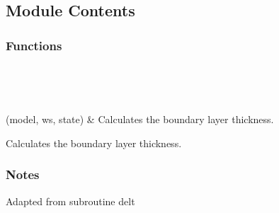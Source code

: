 \documentclass[letterpaper,10pt,english]{sphinxmanual}
\begin{document}
\subsection{Module Contents}
\label{\detokenize{autoapi/BoundaryThickness/index:module-contents}}

\subsubsection{Functions}
\label{\detokenize{autoapi/BoundaryThickness/index:functions}}

\begin{savenotes}\sphinxatlongtablestart\begin{longtable}[c]{}
\hline

\endfirsthead

%
{}\\
\hline

\endhead

\hline
{}\\
\endfoot

\endlastfoot

\sphinxAtStartPar
{\hyperref[\detokenize{autoapi/BoundaryThickness/index:BoundaryThickness.boundary_thickness}]{}}(model, ws, state)
&
\sphinxAtStartPar
Calculates the boundary layer thickness.
\\
\hline
\end{longtable}\sphinxatlongtableend\end{savenotes}

\begin{fulllineitems}
\label{\detokenize{autoapi/BoundaryThickness/index:BoundaryThickness.boundary_thickness}}
\sphinxAtStartPar
Calculates the boundary layer thickness.
\subsubsection*{Notes}

\sphinxAtStartPar
Adapted from subroutine delt

\end{fulllineitems}
\end{document}
